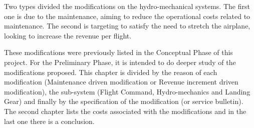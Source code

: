 Two types divided the modifications on the hydro-mechanical systems. The first one is due to the maintenance, aiming to reduce the operational costs related to maintenance. The second is targeting to satisfy the need to stretch the airplane, looking to increase the revenue per flight.

These modifications were previously listed in the Conceptual Phase of this project. For the Preliminary Phase, it is intended to do deeper study of the modifications proposed. This chapter is divided by the reason of each modification (Maintenance driven modification or Revenue increment driven modification), the sub-system (Flight Command, Hydro-mechanics and Landing Gear) and finally by the specification of the modification (or service bulletin). The second chapter lists the costs associated with the modifications and in the last one there is a conclusion.
